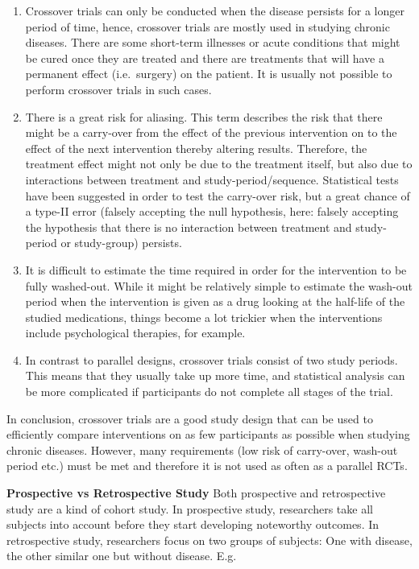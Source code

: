 \documentclass[
]{ctexart}
\begin{document}
\begin{enumerate}
\def\labelenumi{\arabic{enumi}.}
\item
  Crossover trials can only be conducted when the disease persists for a
  longer period of time, hence, crossover trials are mostly used in
  studying chronic diseases. There are some short-term illnesses or
  acute conditions that might be cured once they are treated and there
  are treatments that will have a permanent effect (i.e.~surgery) on the
  patient. It is usually not possible to perform crossover trials in
  such cases.
\item
  There is a great risk for aliasing. This term describes the risk that
  there might be a carry-over from the effect of the previous
  intervention on to the effect of the next intervention thereby
  altering results. Therefore, the treatment effect might not only be
  due to the treatment itself, but also due to interactions between
  treatment and study-period/sequence. Statistical tests have been
  suggested in order to test the carry-over risk, but a great chance of
  a type-II error (falsely accepting the null hypothesis, here: falsely
  accepting the hypothesis that there is no interaction between
  treatment and study-period or study-group) persists.
\item
  It is difficult to estimate the time required in order for the
  intervention to be fully washed-out. While it might be relatively
  simple to estimate the wash-out period when the intervention is given
  as a drug looking at the half-life of the studied medications, things
  become a lot trickier when the interventions include psychological
  therapies, for example.
\item
  In contrast to parallel designs, crossover trials consist of two study
  periods. This means that they usually take up more time, and
  statistical analysis can be more complicated if participants do not
  complete all stages of the trial.
\end{enumerate}

In conclusion, crossover trials are a good study design that can be used
to efficiently compare interventions on as few participants as possible
when studying chronic diseases. However, many requirements (low risk of
carry-over, wash-out period etc.) must be met and therefore it is not
used as often as a parallel RCTs.

\textbf{Prospective vs Retrospective Study} Both prospective and
retrospective study are a kind of cohort study. In prospective study,
researchers take all subjects into account before they start developing
noteworthy outcomes. In retrospective study, researchers focus on two
groups of subjects: One with disease, the other similar one but without
disease. E.g.
\end{document}
